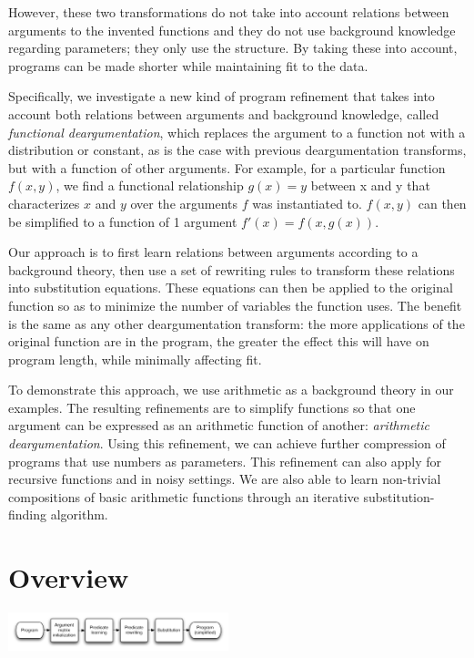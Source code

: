 \documentclass{acmsiggraph}
\begin{document}
However, these two transformations
do not take into account relations between arguments to
the invented functions and they do not use background knowledge regarding
parameters; they only use the structure.
By taking these into account,
programs can be made shorter while maintaining fit to the data.

Specifically, we investigate a new kind of program refinement that takes into account both
relations between arguments and background knowledge,
called \emph{functional deargumentation},
which replaces the argument to a function
not with a distribution or constant,
as is the case with previous deargumentation transforms,
but with a function of other arguments.
For example, for a particular function $f(x, y)$,
we find a functional relationship $g(x) = y$ between x and y
that characterizes $x$ and $y$ over the arguments 
$f$ was instantiated to.
$f(x, y)$ can then be simplified to a function of 1 argument $f'(x) = f(x, g(x))$.

Our approach is to first learn relations between arguments according to a background theory,
then use a set of rewriting rules to transform these relations into substitution equations.
These equations can then be applied to the original function
so as to minimize the number of variables the function uses.
The benefit is the same as any other deargumentation transform:
the more applications of the original function are in the program,
the greater the effect this will have on program length,
while minimally affecting fit.

To demonstrate this approach,
we use arithmetic as a background theory in our examples.
The resulting refinements are to simplify functions
so that one argument can be expressed as an arithmetic function of another:
\emph{arithmetic deargumentation}.
Using this refinement, we can achieve further compression
of programs that use numbers as parameters.
This refinement can also apply for recursive functions and in noisy settings.
We are also able to learn non-trivial compositions of basic arithmetic functions
through an iterative substitution-finding algorithm.

\section{Overview}

\includegraphics[width=0.48\textwidth]{figures/pipeline.pdf}
\end{document}
